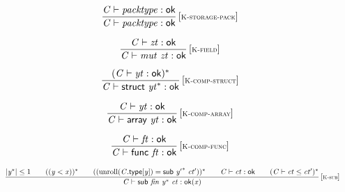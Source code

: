 $$
\begin{array}{@{}c@{}}\displaystyle
\frac{
{\mathit{C}} \vdash {\mathit{packtype}} : \mathsf{ok}
}{
{\mathit{C}} \vdash {\mathit{packtype}} : \mathsf{ok}
} \, {[\textsc{\scriptsize K{-}storage{-}pack}]}
\qquad
\end{array}
$$

$$
\begin{array}{@{}c@{}}\displaystyle
\frac{
{\mathit{C}} \vdash {\mathit{zt}} : \mathsf{ok}
}{
{\mathit{C}} \vdash {\mathit{mut}}~{\mathit{zt}} : \mathsf{ok}
} \, {[\textsc{\scriptsize K{-}field}]}
\qquad
\end{array}
$$

\vspace{1ex}

$$
\begin{array}{@{}c@{}}\displaystyle
\frac{
({\mathit{C}} \vdash {\mathit{yt}} : \mathsf{ok})^\ast
}{
{\mathit{C}} \vdash \mathsf{struct}~{{\mathit{yt}}^\ast} : \mathsf{ok}
} \, {[\textsc{\scriptsize K{-}comp{-}struct}]}
\qquad
\end{array}
$$

$$
\begin{array}{@{}c@{}}\displaystyle
\frac{
{\mathit{C}} \vdash {\mathit{yt}} : \mathsf{ok}
}{
{\mathit{C}} \vdash \mathsf{array}~{\mathit{yt}} : \mathsf{ok}
} \, {[\textsc{\scriptsize K{-}comp{-}array}]}
\qquad
\end{array}
$$

$$
\begin{array}{@{}c@{}}\displaystyle
\frac{
{\mathit{C}} \vdash {\mathit{ft}} : \mathsf{ok}
}{
{\mathit{C}} \vdash \mathsf{func}~{\mathit{ft}} : \mathsf{ok}
} \, {[\textsc{\scriptsize K{-}comp{-}func}]}
\qquad
\end{array}
$$

\vspace{1ex}

$$
\begin{array}{@{}c@{}}\displaystyle
\frac{
{|{{\mathit{y}}^\ast}|} \leq 1
 \qquad
(({\mathit{y}} < {\mathit{x}}))^\ast
 \qquad
(({\mathrm{unroll}}({\mathit{C}}.\mathsf{type}[{\mathit{y}}]) = \mathsf{sub}~{{\mathit{y}'}^\ast}~{\mathit{ct}'}))^\ast
 \qquad
{\mathit{C}} \vdash {\mathit{ct}} : \mathsf{ok}
 \qquad
({\mathit{C}} \vdash {\mathit{ct}} \leq {\mathit{ct}'})^\ast
}{
{\mathit{C}} \vdash \mathsf{sub}~{\mathit{fin}}~{{\mathit{y}}^\ast}~{\mathit{ct}} : {\mathsf{ok}}{({\mathit{x}})}
} \, {[\textsc{\scriptsize K{-}sub}]}
\qquad
\end{array}
$$

